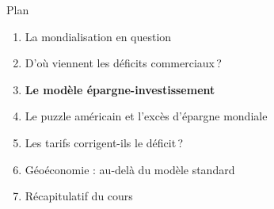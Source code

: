 \documentclass[aspectratio=169]{beamer}
\begin{document}

\begin{frame}{Plan}
   \begin{enumerate}
      \setlength\itemsep{0.4cm}
      \item {\color{gray!50}La mondialisation en question}
      \item {\color{gray!50}D'où viennent les déficits commerciaux\,?}
      \item \textbf{Le modèle épargne-investissement}
      \item Le puzzle américain et l'excès d'épargne mondiale
      \item Les tarifs corrigent-ils le déficit\,?
      \item Géoéconomie : au-delà du modèle standard
      \item Récapitulatif du cours
   \end{enumerate}
\end{frame}

\end{document}
